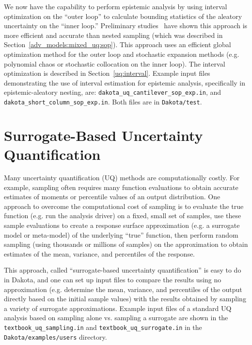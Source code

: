 We now have the capability to perform epistemic analysis by 
using interval optimization on the ``outer loop'' to calculate bounding 
statistics of the aleatory uncertainty on the ``inner loop.''  
Preliminary studies~\cite{Eld09b} have shown this approach is more efficient 
and accurate than nested sampling (which was described in 
Section~\ref{adv_models:mixed_uq:sop}). This approach uses 
an efficient global optimization method for the outer loop and 
stochastic expansion methods (e.g. polynomial chaos or stochastic 
collocation on the inner loop). The interval optimization is described in 
Section~\ref{uq:interval}. Example input files demonstrating 
the use of interval estimation for epistemic analysis, 
specifically in epistemic-aleatory nesting, are: 
\texttt{dakota\_uq\_cantilever\_sop\_exp.in}, and
\texttt{dakota\_short\_column\_sop\_exp.in}. Both files are in
{\tt Dakota/test}.

\section{Surrogate-Based Uncertainty Quantification} \label{adv_models:sbuq}

Many uncertainty quantification (UQ) methods are computationally costly. 
For example, sampling often requires many function evaluations to obtain 
accurate estimates of moments or percentile values of an output distribution. 
One approach to overcome the computational cost of sampling is to 
evaluate the true function (e.g. run the analysis driver) on a fixed, small
set of samples, use these sample evaluations to 
create a response surface approximation (e.g. a surrogate model or meta-model)
of the underlying ``true'' function, then perform random sampling (using 
thousands or millions of samples) on the approximation to obtain estimates 
of the mean, variance, and percentiles of the response. 

This approach, called ``surrogate-based uncertainty quantification'' 
is easy to do in Dakota, and one can set up input files to compare the 
results using no approximation (e.g. determine the mean, variance, and 
percentiles of the output directly based on the initial sample values) 
with the results obtained by sampling a variety of surrogate approximations. 
Example input files of a standard UQ analysis based on sampling alone vs. 
sampling a surrogate are shown in the \texttt{textbook\_uq\_sampling.in} and 
\texttt{textbook\_uq\_surrogate.in} in the \texttt{Dakota/examples/users}
directory. 

